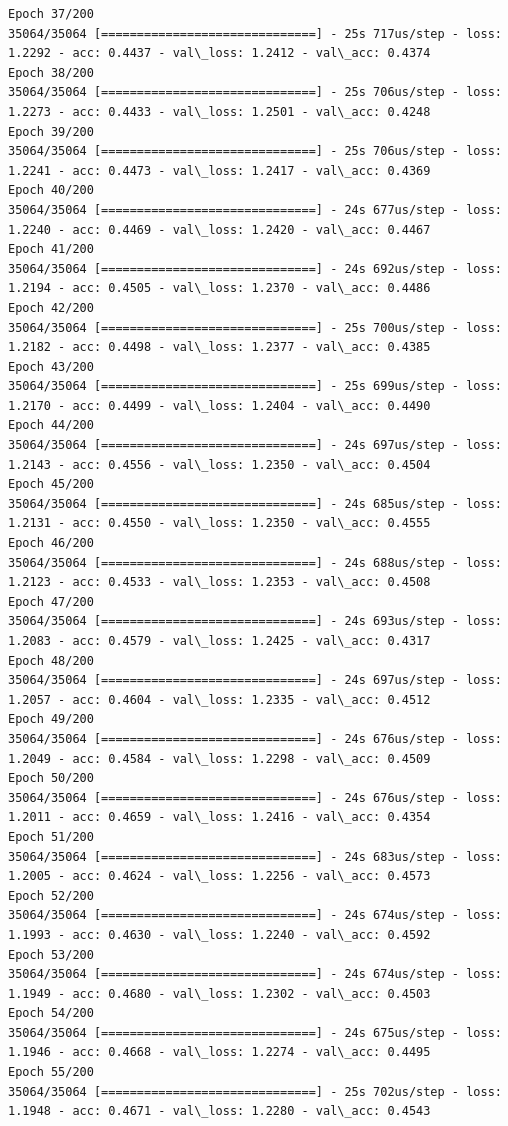 \documentclass[11pt]{article}
\begin{document}
\begin{Verbatim}[commandchars=\\\{\}]
Epoch 37/200
35064/35064 [==============================] - 25s 717us/step - loss: 1.2292 - acc: 0.4437 - val\_loss: 1.2412 - val\_acc: 0.4374
Epoch 38/200
35064/35064 [==============================] - 25s 706us/step - loss: 1.2273 - acc: 0.4433 - val\_loss: 1.2501 - val\_acc: 0.4248
Epoch 39/200
35064/35064 [==============================] - 25s 706us/step - loss: 1.2241 - acc: 0.4473 - val\_loss: 1.2417 - val\_acc: 0.4369
Epoch 40/200
35064/35064 [==============================] - 24s 677us/step - loss: 1.2240 - acc: 0.4469 - val\_loss: 1.2420 - val\_acc: 0.4467
Epoch 41/200
35064/35064 [==============================] - 24s 692us/step - loss: 1.2194 - acc: 0.4505 - val\_loss: 1.2370 - val\_acc: 0.4486
Epoch 42/200
35064/35064 [==============================] - 25s 700us/step - loss: 1.2182 - acc: 0.4498 - val\_loss: 1.2377 - val\_acc: 0.4385
Epoch 43/200
35064/35064 [==============================] - 25s 699us/step - loss: 1.2170 - acc: 0.4499 - val\_loss: 1.2404 - val\_acc: 0.4490
Epoch 44/200
35064/35064 [==============================] - 24s 697us/step - loss: 1.2143 - acc: 0.4556 - val\_loss: 1.2350 - val\_acc: 0.4504
Epoch 45/200
35064/35064 [==============================] - 24s 685us/step - loss: 1.2131 - acc: 0.4550 - val\_loss: 1.2350 - val\_acc: 0.4555
Epoch 46/200
35064/35064 [==============================] - 24s 688us/step - loss: 1.2123 - acc: 0.4533 - val\_loss: 1.2353 - val\_acc: 0.4508
Epoch 47/200
35064/35064 [==============================] - 24s 693us/step - loss: 1.2083 - acc: 0.4579 - val\_loss: 1.2425 - val\_acc: 0.4317
Epoch 48/200
35064/35064 [==============================] - 24s 697us/step - loss: 1.2057 - acc: 0.4604 - val\_loss: 1.2335 - val\_acc: 0.4512
Epoch 49/200
35064/35064 [==============================] - 24s 676us/step - loss: 1.2049 - acc: 0.4584 - val\_loss: 1.2298 - val\_acc: 0.4509
Epoch 50/200
35064/35064 [==============================] - 24s 676us/step - loss: 1.2011 - acc: 0.4659 - val\_loss: 1.2416 - val\_acc: 0.4354
Epoch 51/200
35064/35064 [==============================] - 24s 683us/step - loss: 1.2005 - acc: 0.4624 - val\_loss: 1.2256 - val\_acc: 0.4573
Epoch 52/200
35064/35064 [==============================] - 24s 674us/step - loss: 1.1993 - acc: 0.4630 - val\_loss: 1.2240 - val\_acc: 0.4592
Epoch 53/200
35064/35064 [==============================] - 24s 674us/step - loss: 1.1949 - acc: 0.4680 - val\_loss: 1.2302 - val\_acc: 0.4503
Epoch 54/200
35064/35064 [==============================] - 24s 675us/step - loss: 1.1946 - acc: 0.4668 - val\_loss: 1.2274 - val\_acc: 0.4495
Epoch 55/200
35064/35064 [==============================] - 25s 702us/step - loss: 1.1948 - acc: 0.4671 - val\_loss: 1.2280 - val\_acc: 0.4543

\end{Verbatim}
\end{document}
